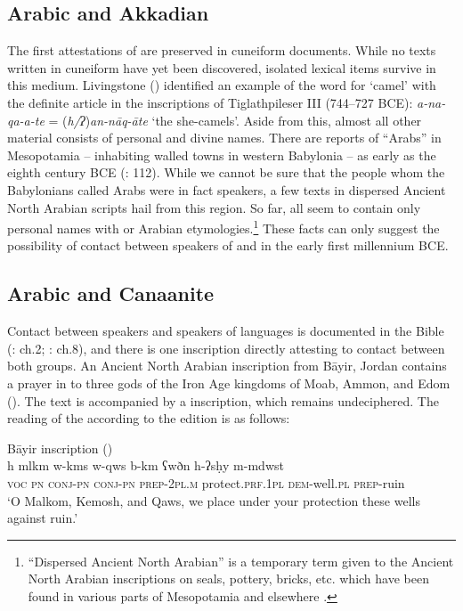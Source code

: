 \documentclass[output=paper]{langsci/langscibook}
\begin{document}
\subsection{Arabic and Akkadian}
The first attestations of  are preserved in cuneiform documents. While no  texts written in cuneiform have yet been discovered, isolated lexical items survive in this medium. Livingstone (\citeyear{Livingstone1997}) identified an example of the   word for `camel' with the {definite} {article} in the inscriptions of Tiglathpileser III (744--727 BCE): \textit{a-na-qa-a-te} = (\textit{h/ʔ})\textit{an-nāq-āte} ‘the she-camels’. Aside from this, almost all other  material consists of personal and divine names. There are reports of “Arabs” in Mesopotamia – inhabiting walled towns in western Babylonia – as early as the eighth century BCE (\citealt{Ephal1974}: 112). While we cannot be sure that the people whom the Babylonians called Arabs were in fact  speakers, a few texts in dispersed Ancient North Arabian scripts hail from this region. So far, all seem to contain only personal names with  or Arabian etymologies.\footnote{``Dispersed Ancient North Arabian'' is a temporary term given to the Ancient North Arabian inscriptions on seals, pottery, bricks, etc. which have been found in various parts of Mesopotamia and elsewhere \citep[33]{Macdonald2000}.}  These facts can only suggest the possibility of contact between speakers of  and  in the early first millennium BCE.

\subsection{Arabic and Canaanite}\label{Canaanite}
Contact between  speakers and speakers of  languages is documented in the  Bible (\citealt{Ephal1982}: ch.2; \citealt{Retsö2003}: ch.8), and there is one inscription directly attesting to contact between both groups. An Ancient North Arabian inscription from Bāyir, Jordan contains a prayer in   to three gods of the Iron Age  kingdoms of Moab, Ammon, and Edom (\citealt{Hayajnehetal2015}). The text is accompanied by a  inscription, which remains undeciphered. The reading of the  according to the edition is as follows:

\ea Bāyir inscription (\citealt{Hayajnehetal2015})\\
\gll h 	mlkm 	w-kms 	w-qws 	b-km 		   ʕwðn h-ʔsḥy 		m-mdwst	\\
     \textsc{voc} \textsc{pn} \textsc{conj-pn} \textsc{conj-pn} \textsc{prep-2pl.m} protect.\textsc{prf.1pl} \textsc{dem}-well.\textsc{pl} \textsc{prep}-ruin \\
\glt ‘O Malkom, Kemosh, and Qaws, we place under your protection these wells against ruin.’
\z
\end{document}
